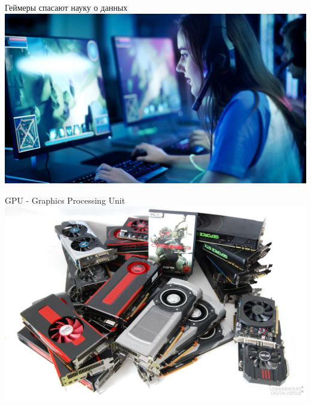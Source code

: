 \documentclass[aspectratio=169, professionalfonts]{beamer}
\begin{document}
\begin{frame}{Геймеры спасают науку о данных}
    \centering
    \includegraphics[width=.83\linewidth]{figures/fig54-gamer-girl.jpg}
\end{frame}

\begin{frame}{GPU - Graphics Processing Unit}
    \centering
    \includegraphics[width=.74\linewidth]{figures/fig55-gpus.jpg}
\end{frame}
\end{document}

